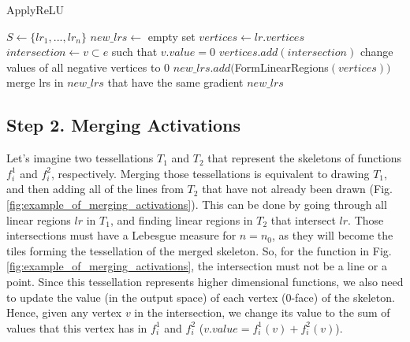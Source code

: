 \documentclass{article}
\begin{document}
\begin{algorithm}
    \caption{ApplyReLU}\label{alg:apply_relu}
    \begin{algorithmic}
        \Require $S \gets \{lr_1, ..., lr_n\}$  
        \State $new\_lrs \gets$ empty set
          
            \State $vertices \gets lr.vertices$
                    \State $intersection \gets v \subset e$ such that $v.value = 0$
                    \State $vertices.add(intersection)$
                \EndIf
            \EndFor
            \State change values of all negative vertices to $0$
            \State $new\_lrs.add($FormLinearRegions$(vertices))$
        \EndFor
        \State merge lrs in $new\_lrs$ that have the same gradient
        \State \Return $new\_lrs$  
    \end{algorithmic}
\end{algorithm}

\subsection{Step 2. Merging Activations}

Let's imagine two tessellations $T_1$ and $T_2$ that represent the skeletons of functions $f_i^1$ and $f_i^2$, respectively. Merging those tessellations is equivalent to drawing $T_1$, and then adding all of the lines from $T_2$ that have not already been drawn (Fig. \ref{fig:example_of_merging_activations}). This can be done by going through all linear regions $lr$ in $T_1$, and finding linear regions in $T_2$ that intersect $lr$. Those intersections must have a Lebesgue measure for $n = n_0$, as they will become the tiles forming the tessellation of the merged skeleton. So, for the function in Fig. \ref{fig:example_of_merging_activations}, the intersection must not be a line or a point. Since this tessellation represents higher dimensional functions, we also need to update the value (in the output space) of each vertex ($0$-face) of the skeleton. Hence, given any vertex $v$ in the intersection, we change its value to the sum of values that this vertex has in $f_i^1$ and $f_i^2$ ($v.value = f_i^1(v) + f_i^2(v)$).
\end{document}
